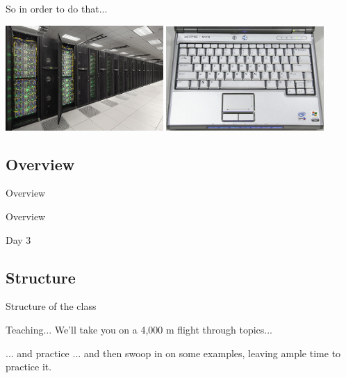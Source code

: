 \documentclass[xcolor=table,compress]{beamer}
\begin{document}
\begin{frame}{So in order to do that...}
\pause
\begin{center}
\includegraphics[width=0.45\textwidth]{./stampede}
\pause
\includegraphics[width=0.45\textwidth]{./keyboard}
\end{center}
\end{frame}


\subsection{Overview}


\begin{frame}{Overview}

\end{frame}

\begin{frame}{Overview}
\begin{block}{Day 3}

\end{block}
\end{frame}

\subsection{Structure}

\begin{frame}{Structure of the class}
\begin{block}{Teaching...}
We'll take you on a 4,000 m flight through topics...
\end{block}
\pause
\begin{block}{... and practice}
... and then swoop in on some examples, leaving ample time to practice it.
\end{block}
\end{frame}
\end{document}
